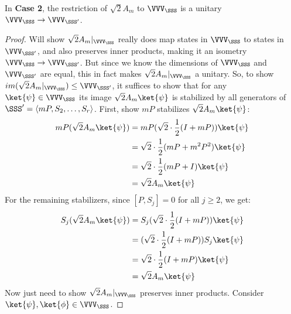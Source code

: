 \begin{proposition}\label{prop:A_m_unitary_up_to_normalisation}
    In \textbf{Case 2}, the restriction of $\sqrt{2} A_m$ to $\VVV_\SSS$ is a unitary $\VVV_\SSS \to \VVV_{\SSS'}$.
    \begin{proof}
        Will show $\sqrt{2} A_m|_{\VVV_\SSS}$ really does map states in $\VVV_\SSS$ to states in $\VVV_{\SSS'}$, and also preserves inner products, making it an isometry $\VVV_\SSS \to \VVV_{\SSS'}$.
        But since we know the dimensions of $\VVV_\SSS$ and $\VVV_{\SSS'}$ are equal, this in fact makes $\sqrt{2} A_m|_{\VVV_\SSS}$ a unitary.
        So, to show $im(\sqrt{2} A_m|_{\VVV_\SSS}) \leq \VVV_{\SSS'}$, it suffices to show that for any $\ket{\psi} \in \VVV_\SSS$ its image $\sqrt{2} A_m\ket{\psi}$ is stabilized by all generators of $\SSS' = \langle mP, S_2, \ldots, S_r \rangle$.
        First, show $mP$ stabilizes $\sqrt{2} A_m\ket{\psi}$:
        \begin{equation}\label{eq:mP_stabilizes_new_state}
        \begin{aligned}
            mP(\sqrt{2} A_m\ket{\psi})
            &= mP(\sqrt{2} \cdot \frac{1}{2}(I + mP))\ket{\psi} \\
            &= \sqrt{2} \cdot \frac{1}{2}(mP + m^2 P^2) \ket{\psi} \\
            &= \sqrt{2} \cdot \frac{1}{2}(mP + I) \ket{\psi} \\
            &= \sqrt{2} A_m\ket{\psi} \\
        \end{aligned}
        \end{equation}
        For the remaining stabilizers, since $[P, S_j] = 0$ for all $j \geq 2$, we get:
        \begin{equation}\label{eq:S_j_stabilizes_new_state}
        \begin{aligned}
            S_j(\sqrt{2} A_m\ket{\psi})
            &= S_j(\sqrt{2} \cdot \frac{1}{2}(I + mP))\ket{\psi} \\
            &= (\sqrt{2} \cdot \frac{1}{2}(I + mP)) S_j \ket{\psi} \\
            &= \sqrt{2} \cdot \frac{1}{2}(I + mP) \ket{\psi} \\
            &= \sqrt{2} A_m\ket{\psi} \\
        \end{aligned}
        \end{equation}
        Now just need to show $\sqrt{2} A_m|_{\VVV_\SSS}$ preserves inner products.
        Consider $\ket{\psi}, \ket{\phi} \in \VVV_\SSS$.

\end{proof}
\end{proposition}
